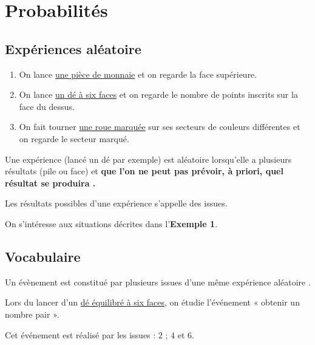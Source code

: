 \documentclass[a4paper,10pt]{report}
\begin{document}
\newpage
\setcounter{chapter}{17}
\chapter{Probabilités}

\section{Expériences aléatoire}

\begin{ex}
\begin{enumerate}
\item On lance \href{https://fr.piliapp.com/random/coin/}{une pièce de monnaie} et on regarde la face supérieure.
\item On lance \href{https://fr.piliapp.com/random/dice/}{un dé à six faces} et on regarde le nombre de points inscrits sur la face du dessus.
\item On fait tourner \href{https://fr.piliapp.com/random/wheel/}{une roue marquée} sur ses secteurs de couleurs différentes et on regarde le secteur marqué.
\end{enumerate}
\end{ex}

\begin{defn}
Une expérience (lancé un dé par exemple) est aléatoire lorsqu'elle a plusieurs résultats (pile ou face) et \textbf{que l'on ne peut pas prévoir, à priori, quel résultat se produira .}

\medskip
\noindent Les résultats possibles d'une expérience s'appelle des issues.
\end{defn}

\begin{ex}
On s'intéresse aux situations décrites dans l'\textbf{Exemple 1}.

\medskip \noindent\grandscarreaux{\linewidth}{3.2cm}
\end{ex}

\section{Vocabulaire}

\begin{defn}
Un évènement est constitué par plusieurs issues d'une même expérience aléatoire .
\end{defn}

\begin{ex}
Lors du lancer d'un \href{https://fr.piliapp.com/random/dice/}{dé équilibré à six faces}, on étudie l'événement « obtenir un nombre pair ».

\medskip
\noindent Cet événement est réalisé par les issues : $2$ ; $4$ et $6$.
\end{ex}
\end{document}
